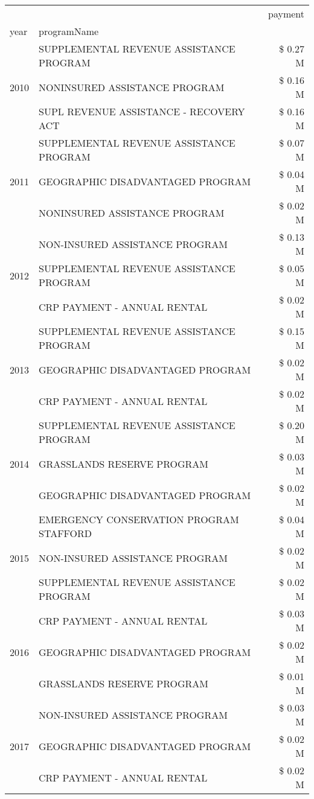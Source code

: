 \begin{tabular}{llr}
\toprule
 &  & payment \\
year & programName &  \\
\midrule
\multirow[t]{3}{*}{2010} & SUPPLEMENTAL REVENUE ASSISTANCE PROGRAM & \$ 0.27 M \\
 & NONINSURED ASSISTANCE PROGRAM & \$ 0.16 M \\
 & SUPL REVENUE ASSISTANCE - RECOVERY ACT & \$ 0.16 M \\
\cline{1-3}
\multirow[t]{3}{*}{2011} & SUPPLEMENTAL REVENUE ASSISTANCE PROGRAM & \$ 0.07 M \\
 & GEOGRAPHIC DISADVANTAGED PROGRAM & \$ 0.04 M \\
 & NONINSURED ASSISTANCE PROGRAM & \$ 0.02 M \\
\cline{1-3}
\multirow[t]{3}{*}{2012} & NON-INSURED ASSISTANCE PROGRAM & \$ 0.13 M \\
 & SUPPLEMENTAL REVENUE ASSISTANCE PROGRAM & \$ 0.05 M \\
 & CRP PAYMENT - ANNUAL RENTAL & \$ 0.02 M \\
\cline{1-3}
\multirow[t]{3}{*}{2013} & SUPPLEMENTAL REVENUE ASSISTANCE PROGRAM & \$ 0.15 M \\
 & GEOGRAPHIC DISADVANTAGED PROGRAM & \$ 0.02 M \\
 & CRP PAYMENT - ANNUAL RENTAL & \$ 0.02 M \\
\cline{1-3}
\multirow[t]{3}{*}{2014} & SUPPLEMENTAL REVENUE ASSISTANCE PROGRAM & \$ 0.20 M \\
 & GRASSLANDS RESERVE PROGRAM & \$ 0.03 M \\
 & GEOGRAPHIC DISADVANTAGED PROGRAM & \$ 0.02 M \\
\cline{1-3}
\multirow[t]{3}{*}{2015} & EMERGENCY CONSERVATION PROGRAM STAFFORD & \$ 0.04 M \\
 & NON-INSURED ASSISTANCE PROGRAM & \$ 0.02 M \\
 & SUPPLEMENTAL REVENUE ASSISTANCE PROGRAM & \$ 0.02 M \\
\cline{1-3}
\multirow[t]{3}{*}{2016} & CRP PAYMENT - ANNUAL RENTAL & \$ 0.03 M \\
 & GEOGRAPHIC DISADVANTAGED PROGRAM & \$ 0.02 M \\
 & GRASSLANDS RESERVE PROGRAM & \$ 0.01 M \\
\cline{1-3}
\multirow[t]{3}{*}{2017} & NON-INSURED ASSISTANCE PROGRAM & \$ 0.03 M \\
 & GEOGRAPHIC DISADVANTAGED PROGRAM & \$ 0.02 M \\
 & CRP PAYMENT - ANNUAL RENTAL & \$ 0.02 M \\

\end{tabular}
